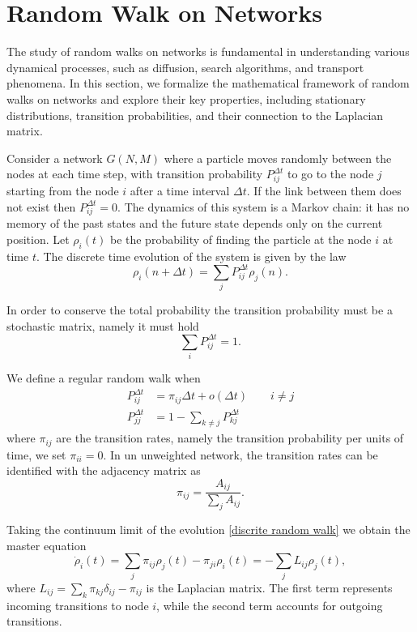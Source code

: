 \section{Random Walk on Networks}

The study of random walks on networks is fundamental in understanding various dynamical processes, such as diffusion, search algorithms, and transport phenomena. In this section, we formalize the mathematical framework of random walks on networks and explore their key properties, including stationary distributions, transition probabilities, and their connection to the Laplacian matrix.

Consider a network $G(N,M)$ where a particle moves randomly between the nodes at each time step, with transition probability $P_{ij}^{\Delta t}$ to go to the node $j$ starting from the node $i$ after a time interval $\Delta t$. If the link between them does not exist then $P_{ij}^{\Delta t}= 0$. 
The dynamics of this system is a Markov chain: it has no memory of the past states and the future state depends only on the current position.
Let $\rho_i(t)$ be the probability of finding the particle at the node $i$ at time $t$. The discrete time evolution of the system is given by the law
\begin{equation}\label{discrite random walk}
    \rho_i(n+\Delta t) = \sum_j P_{ij}^{\Delta t}\rho_j(n).
\end{equation}

In order to conserve the total probability the transition probability must be a stochastic matrix, namely it must hold 
\begin{equation}
    \sum_i P_{ij}^{\Delta t} = 1 .
\end{equation}

We define a regular random walk when
\begin{align}
    P^{\Delta t}_{ij}&=\pi_{ij}\Delta t + o(\Delta t) \qquad i\ne j\\
    P^{\Delta t}_{jj}&=1-\sum_{k\ne j}P^{\Delta t}_{kj}
\end{align}
where $\pi_{ij}$ are the transition rates, namely the transition probability per units of time, we set $\pi_{ii}=0$.
In un unweighted network, the transition rates can be identified with the adjacency matrix as
\begin{equation}
    \pi_{ij} = \frac{A_{ij}}{\sum_j A_{ij}}.
\end{equation}

Taking the continuum limit of the evolution \eqref{discrite random walk} we obtain the master equation \cite{Classic_random_walk}
\begin{equation}\label{master_eq}
    \dot \rho_i(t) = \sum_j \pi_{ij}\rho_j(t) - \pi_{ji}\rho_i(t) = - \sum_j L_{ij} \rho_j(t),
\end{equation}
where $L_{ij} = \sum_k \pi_{kj}\delta_{ij} -\pi_{ij} $ is the Laplacian matrix.
The first term represents incoming transitions to node $i$, while the second term accounts for outgoing transitions.

